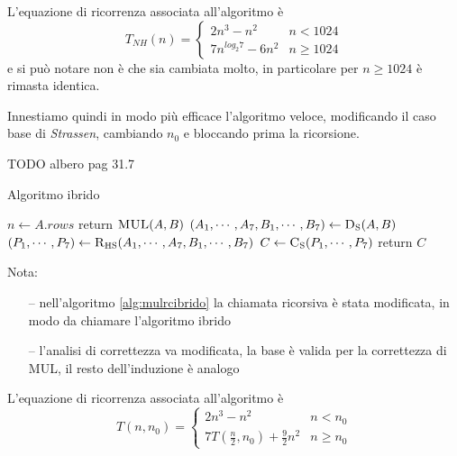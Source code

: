 L'equazione di ricorrenza associata all'algoritmo è
\begin{equation*}
    T_{NH}(n) = 
    \begin{cases}
        2n^3 - n^2 & n<1024 \\
        7 n^{log_2 7} - 6n^2& n \geq 1024
    \end{cases}
    \label{eq:ricnaivehybrid}
\end{equation*}
e si può notare non è che sia cambiata molto, in particolare per $n \geq 1024 $ è rimasta identica.

Innestiamo quindi in modo più efficace l'algoritmo veloce, modificando il caso base di \textit{Strassen}, cambiando $n_0$ e bloccando prima la ricorsione.

TODO albero pag 31.7

\begin{algorithm}[H]
    \caption{Algoritmo ibrido}\label{alg:mulrcibrido}
\begin{algorithmic}[1]
    \State $n \gets A.rows$
        \State return $\Call{MUL}{A,B}$
    \EndIf
    \State $\left( A_1, \cdots, A_7, B_1, \cdots, B_7 \right) \gets \Call{D\textsubscript{S}}{A, B}$
    \State $\left( P_1, \cdots, P_7 \right) \gets \Call{R\textsubscript{HS}}{A_1, \cdots, A_7, B_1, \cdots, B_7}$
    \State $C  \gets \Call{C\textsubscript{S}}{P_1, \cdots, P_7}$
    \State return $C$
    \EndProcedure
\end{algorithmic}
\end{algorithm}

Nota:
\begin{itemize}[noitemsep,topsep=0pt,parsep=0pt,partopsep=0pt]
    \item[--] nell'algoritmo \ref{alg:mulrcibrido} la chiamata ricorsiva è stata modificata, in modo da chiamare l'algoritmo ibrido
    \item[--] l'analisi di correttezza va modificata, la base è valida per la correttezza di MUL, il resto dell'induzione è analogo
\end{itemize}

L'equazione di ricorrenza associata all'algoritmo è
\begin{equation}
    T(n, n_0) = 
    \begin{cases}
        2n^3 - n^2 & n<n_0 \\
        7 T \left( \frac{n}{2}, n_0 \right) + \frac{9}{2}n^2 & n \geq n_0
    \end{cases}
    \label{eq:richybrid}
\end{equation}

